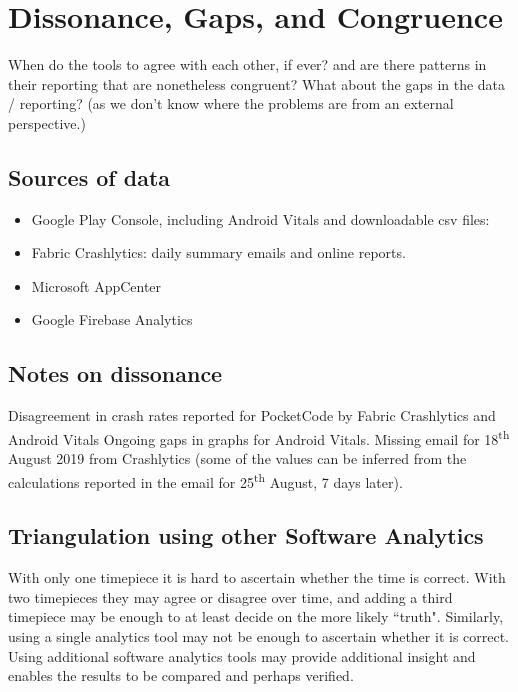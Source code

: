 \section{Dissonance, Gaps, and Congruence}
When do the tools to agree with each other, if ever? and are there patterns in their reporting that are nonetheless congruent? What about the gaps in the data / reporting? (as we don't know where the problems are from an external perspective.)

\subsection{Sources of data}
\begin{itemize}
    \item Google Play Console, including Android Vitals and downloadable csv files:
    \item Fabric Crashlytics: daily summary emails and online reports.
    \item Microsoft AppCenter
    \item Google Firebase Analytics
\end{itemize}

\subsection{Notes on dissonance}
Disagreement in crash rates reported for PocketCode by Fabric Crashlytics and Android Vitals
Ongoing gaps in graphs for Android Vitals. Missing email for 18\textsuperscript{th} August 2019 from Crashlytics (some of the values can be inferred from the calculations reported in the email for 25\textsuperscript{th} August, 7 days later).

\subsection{Triangulation using other Software Analytics}
With only one timepiece it is hard to ascertain whether the time is correct. With two timepieces they may agree or disagree over time, and adding a third timepiece may be enough to at least decide on the more likely ``truth". Similarly, using a single analytics tool may not be enough to ascertain whether it is correct. Using additional software analytics tools may provide additional insight and enables the results to be compared and perhaps verified. 

